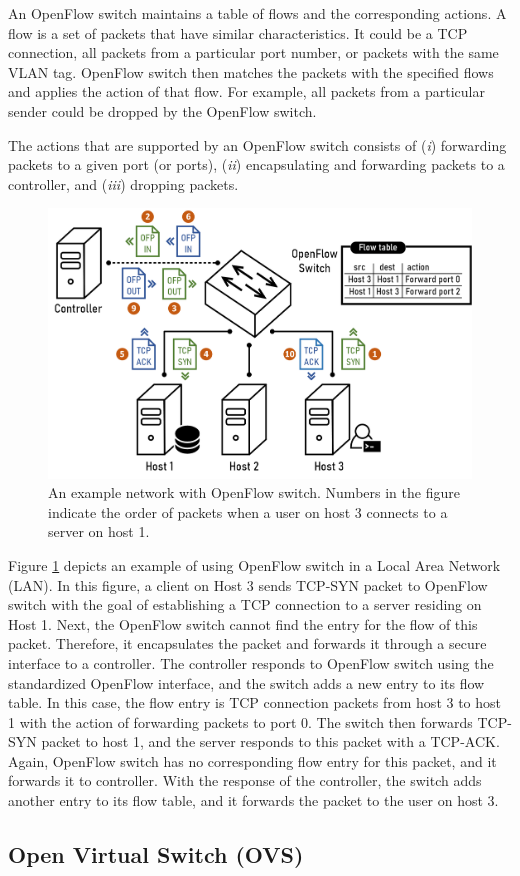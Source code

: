 An OpenFlow switch maintains a table of flows and the corresponding actions. 
A flow is a set of packets that have similar characteristics. It could be a 
TCP connection, all packets from a particular port number, or packets 
with the same VLAN tag. OpenFlow switch then matches the 
packets with the specified flows and applies the action of that flow. 
For example, all packets from
a particular sender could be dropped by the OpenFlow switch. 


The actions that are supported by an
OpenFlow switch consists of (\emph{i}) forwarding packets to a given port (or ports),
(\emph{ii}) encapsulating and forwarding packets to a controller, and
(\emph{iii}) dropping packets.

\begin{figure}
\small
\center
\includegraphics[width=\textwidth]{../Figures/openflow.png}
\caption{An example network with OpenFlow switch. Numbers in the figure 
indicate the order of packets when a user on host 3 connects 
to a server on host 1.}
\label{fig:openflow}
\end{figure}

Figure \ref{fig:openflow} depicts an example of using OpenFlow switch in 
a Local Area Network (LAN). In this figure,  a client on Host 3 
sends TCP-SYN packet to OpenFlow switch with the goal of establishing a TCP connection
to a server residing on Host 1. Next,  the OpenFlow switch 
cannot find the entry for the flow of this packet. Therefore, it encapsulates 
the packet and forwards it through a secure interface to a controller.
 The controller responds to OpenFlow switch using the standardized OpenFlow interface,
and the switch adds a new entry to its flow table. In this case, the flow entry is 
TCP connection packets from host 3 to host 1 with the action of forwarding
packets to port 0.
 The switch then forwards TCP-SYN packet to host 1, and  
the server responds to this packet with a TCP-ACK. Again,  OpenFlow 
switch has no corresponding flow entry for this packet, and it forwards it to 
controller.  With the response of the controller, the switch adds another 
entry to its flow table, and  it forwards the packet to the user on host 3.

\subsection{Open Virtual Switch (OVS)}

